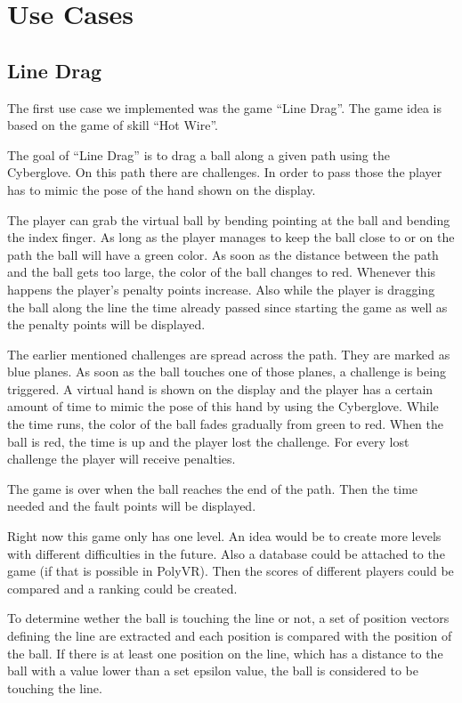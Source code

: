 \section{Use Cases}

\subsection{Line Drag}
The first use case we implemented was the game ``Line Drag''. The game idea is based on the game of skill ``Hot Wire''.

The goal of ``Line Drag'' is to drag a ball along a given path using the Cyberglove. On this path there are challenges. In order to pass those the player has to mimic the pose of the hand shown on the display. 

The player can grab the virtual ball by bending pointing at the ball and bending the index finger. As long as the player manages to keep the ball close to or on the path the ball will have a green color. As soon as the distance between the path and the ball gets too large, the color of the ball changes to red. Whenever this happens the player's penalty points increase. Also while the player is dragging the ball along the line the time already passed since starting the game as well as the penalty points will be displayed. 

The earlier mentioned challenges are spread across the path. They are marked as blue planes. As soon as the ball touches one of those planes, a challenge is being triggered. A virtual hand is shown on the display and the player has a certain amount of time to mimic the pose of this hand by using the Cyberglove. While the time runs, the color of the ball fades gradually from green to red. When the ball is red, the time is up and the player lost the challenge. For every lost challenge the player will receive penalties.

The game is over when the ball reaches the end of the path. Then the time needed and the fault points will be displayed.

Right now this game only has one level. An idea would be to create more levels with different difficulties in the future. 
Also a database could be attached to the game (if that is possible in PolyVR). Then the scores of different players could be compared and a ranking could be created.

To determine wether the ball is touching the line or not, a set of position vectors defining the line are extracted and each position is compared with the position of the ball. If there is at least one position on the line, which has a distance to the ball with a value lower than a set epsilon value, the ball is considered to be touching the line.

